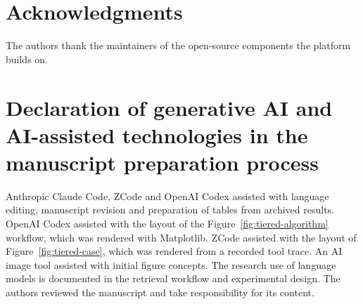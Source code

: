 \section*{Acknowledgments}
The authors thank the maintainers of the open-source components the platform
builds on. %

\section*{Declaration of generative AI and AI-assisted technologies in the manuscript preparation process}
Anthropic Claude Code, ZCode and OpenAI Codex assisted with language editing,
manuscript revision and preparation of tables from archived results.
OpenAI Codex assisted with the layout of the Figure~\ref{fig:tiered-algorithm}
workflow, which was rendered with Matplotlib. ZCode assisted with the layout
of Figure~\ref{fig:tiered-case}, which was rendered from a recorded tool
trace. An AI image tool assisted
with initial figure concepts. The research use of language models is documented in the retrieval workflow
and experimental design. The authors reviewed the manuscript and take
responsibility for its content.


